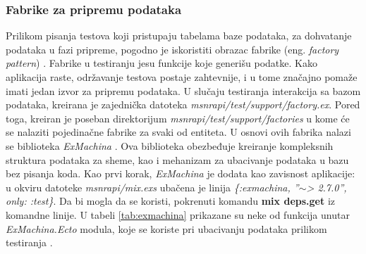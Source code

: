\documentclass[12pt,oneside]{memoir}
\begin{document}
\subsubsection{Fabrike za pripremu podataka}
\par Prilikom pisanja testova koji pristupaju tabelama baze podataka, za dohvatanje podataka u fazi pripreme, pogodno je iskoristiti obrazac fabrike (eng. \emph{factory pattern}) \cite{fabrike}. Fabrike u testiranju jesu funkcije koje generišu podatke. Kako aplikacija raste, održavanje testova postaje zahtevnije, i u tome značajno pomaže imati jedan izvor za pripremu podataka. U slučaju testiranja interakcija sa bazom podataka, kreirana je zajednička datoteka \emph{msnr{\textunderscore}api/test/support/factory.ex}. Pored toga, kreiran je poseban direktorijum \emph{msnr{\textunderscore}api/test/support/factories} u kome će se nalaziti pojedinačne fabrike za svaki od entiteta. U osnovi ovih fabrika nalazi se biblioteka \emph{ExMachina} \cite{exmachina}. Ova biblioteka obezbeđuje kreiranje kompleksnih struktura podataka za sheme, kao i mehanizam za ubacivanje podataka u bazu bez pisanja koda. Kao prvi korak, \emph{ExMachina} je dodata kao zavisnost aplikacije: u okviru datoteke \emph{msnr{\textunderscore}api/mix.exs} ubačena je linija \textit{\{:exmachina, ''$\sim$> 2.7.0'', only: :test\}}. Da bi mogla da se koristi, pokrenuti komandu \textbf{mix deps.get} iz komandne linije. U tabeli \ref{tab:exmachina} prikazane su neke od funkcija unutar \emph{ExMachina.Ecto} modula, koje se koriste pri ubacivanju podataka prilikom testiranja \cite{execto}.
\end{document}
